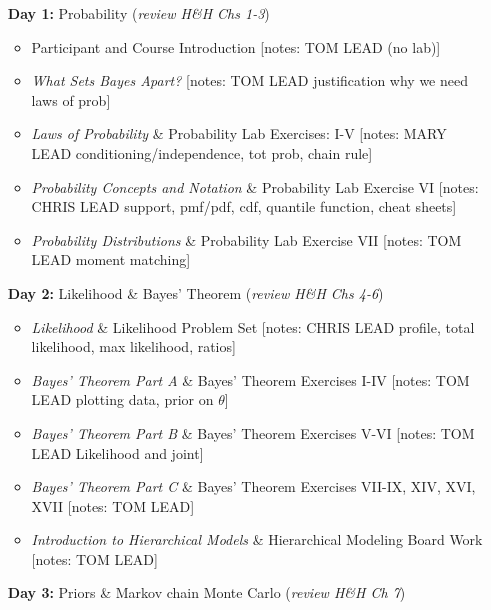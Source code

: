 \documentclass[11pt]{article}
\begin{document}
\begin{enumerate}
\item[\textbf{Day 1:}] Probability (\emph{review H\&H Chs 1-3})

\begin{itemize}
\item Participant and Course Introduction [notes: TOM LEAD (no lab)]
\item \emph{What Sets Bayes Apart?} [notes: TOM LEAD justification why we need laws of prob]
\item \emph{Laws of Probability} \& Probability Lab Exercises: I-V [notes: MARY LEAD conditioning/independence, tot prob, chain rule]
\item \emph{Probability Concepts and Notation} \& Probability Lab Exercise VI [notes: CHRIS LEAD support, pmf/pdf, cdf, quantile function, cheat sheets]
\item \emph{Probability Distributions}  \& Probability Lab Exercise VII [notes: TOM LEAD moment matching]
\end{itemize}

\item[\textbf{Day 2:}] Likelihood \& Bayes' Theorem (\emph{review H\&H Chs 4-6})

\begin{itemize}
\item \emph{Likelihood} \& Likelihood Problem Set [notes: CHRIS LEAD profile, total likelihood, max likelihood, ratios]
\item \emph{Bayes' Theorem Part A} \& Bayes' Theorem Exercises I-IV [notes: TOM LEAD plotting data, prior on $\theta$]
\item \emph{Bayes' Theorem Part B} \& Bayes' Theorem Exercises  V-VI [notes: TOM LEAD Likelihood and joint]
\item \emph{Bayes' Theorem Part C} \& Bayes' Theorem Exercises VII-IX, XIV, XVI, XVII [notes: TOM LEAD]
\item \emph{Introduction to Hierarchical Models} \& Hierarchical Modeling Board Work [notes: TOM LEAD]
\end{itemize}


\item[\textbf{Day 3:}] Priors \& Markov chain Monte Carlo (\emph{review H\&H Ch 7})


\end{enumerate}
\end{document}
